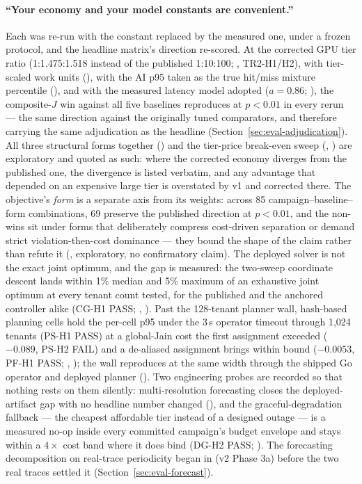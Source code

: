 \paragraph{``Your economy and your model constants are convenient.''}
Each was re-run with the constant replaced by the measured one, under a
frozen protocol, and the headline matrix's direction re-scored. At the
corrected GPU tier ratio (1:1.475:1.518 instead of the published
1:10:100; , TR2-H1/H2), with tier-scaled
work units (), with the AI p95 taken as the
true hit/miss mixture percentile (), and
with the measured latency model adopted ($a{=}0.86$;
), the composite-$J$ win against all five
baselines reproduces at $p<0.01$ in every rerun --- the same direction
against the originally tuned comparators, and therefore carrying the same
adjudication as the headline (Section~\ref{sec:eval-adjudication}). All
three structural forms together () and the
tier-price break-even sweep (,
) are exploratory and quoted as such: where
the corrected economy diverges from the published one, the divergence is
listed verbatim, and any advantage that depended on an expensive large tier
is overstated by v1 and corrected there. The objective's \emph{form} is a
separate axis from its weights: across 85 campaign--baseline--form
combinations, 69 preserve the published direction at $p<0.01$, and the
non-wins sit under forms that deliberately compress cost-driven separation
or demand strict violation-then-cost dominance --- they bound the shape of
the claim rather than refute it (, exploratory,
no confirmatory claim). The deployed solver is not the exact joint
optimum, and the gap is measured: the two-sweep coordinate descent lands
within 1\% median and 5\% maximum of an exhaustive joint optimum at every
tenant count tested, for the published and the anchored controller alike
(CG-H1 PASS; , ).
Past the 128-tenant planner wall, hash-based planning cells hold the
per-cell p95 under the 3\,s operator timeout through 1{,}024 tenants
(PS-H1 PASS) at a global-Jain cost the first assignment exceeded
($-0.089$, PS-H2 FAIL) and a de-aliased assignment brings within bound
($-0.0053$, PF-H1 PASS; ,
); the wall reproduces at the same
width through the shipped Go operator and deployed planner
(). Two engineering probes are recorded so that
nothing rests on them silently: multi-resolution forecasting closes the
deployed-artifact gap with no headline number changed
(), and the graceful-degradation fallback --- the
cheapest affordable tier instead of a designed outage --- is a measured
no-op inside every committed campaign's budget envelope and stays within a
$4\times$ cost band where it does bind (DG-H2 PASS;
). The forecasting decomposition on real-trace
periodicity began in  (v2 Phase 3a) before the
two real traces settled it (Section~\ref{sec:eval-forecast}).

